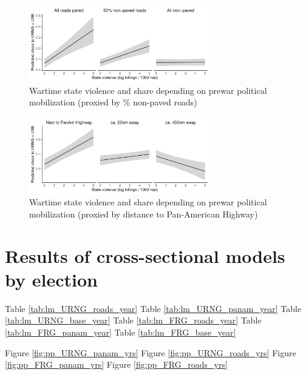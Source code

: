 \documentclass[a4paper, 12pt, notitlepage]{article}
\begin{document}
\begin{figure}[htb!]
  \centering
    \includegraphics[width = 0.7\textwidth]{img/pp_fullizq_roads}

  \caption{Wartime state violence and {} share depending on prewar political mobilization (proxied by \% non-paved roads)} \label{fig:pp_fullizq_roads}

\end{figure}

\begin{figure}[htb!]
  \centering
    \includegraphics[width = 0.7\textwidth]{img/pp_fullizq_panam}

  \caption{Wartime state violence and {} share depending on prewar political mobilization (proxied by distance to Pan-American Highway)} \label{fig:pp_fullizq_panam}

\end{figure}


\clearpage
\section{Results of cross-sectional models by election}\label{app:results_year}

Table \ref{tab:lm_URNG_roads_year}
Table \ref{tab:lm_URNG_panam_year}
Table \ref{tab:lm_URNG_base_year}
Table \ref{tab:lm_FRG_roads_year}
Table \ref{tab:lm_FRG_panam_year}
Table \ref{tab:lm_FRG_base_year}

Figure \ref{fig:pp_URNG_panam_yrs}
Figure \ref{fig:pp_URNG_roads_yrs}
Figure \ref{fig:pp_FRG_panam_yrs}
Figure \ref{fig:pp_FRG_roads_yrs}







\end{document}
